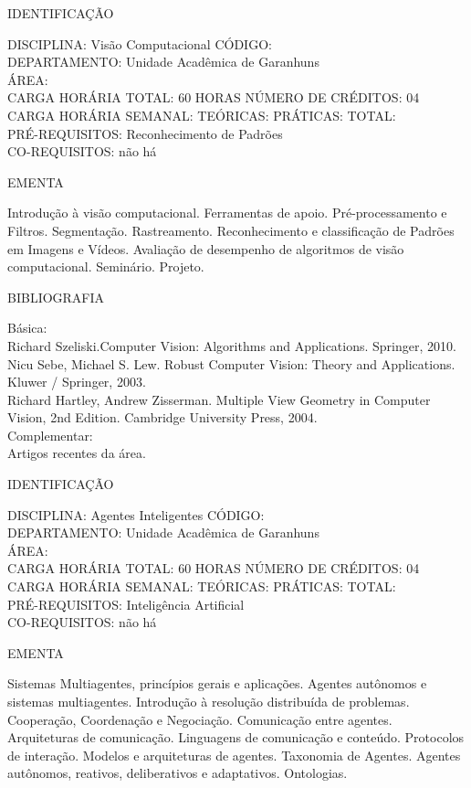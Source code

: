 \documentclass[
	12pt,				%
	openright,			%
  oneside,     %
	a4paper,			%
	english,			%
	french,				%
	spanish,			%
	brazil				%
	]{abntex2}
\begin{document}
\begin{apendicesenv}
\newpage IDENTIFICAÇÃO

DISCIPLINA: Visão Computacional CÓDIGO:\\ 
DEPARTAMENTO: Unidade Acadêmica de Garanhuns\\
ÁREA: \\
CARGA HORÁRIA TOTAL: 60 HORAS NÚMERO DE CRÉDITOS: 04\\
CARGA HORÁRIA SEMANAL: TEÓRICAS: PRÁTICAS: TOTAL: \\
PRÉ-REQUISITOS: Reconhecimento de Padrões\\
CO-REQUISITOS: não há

EMENTA 

Introdução à visão computacional. Ferramentas de apoio.
Pré-processamento e Filtros. Segmentação. Rastreamento. Reconhecimento
e classificação de Padrões em Imagens e Vídeos. Avaliação de desempenho
de algoritmos de visão computacional. Seminário. Projeto.

BIBLIOGRAFIA 

Básica:\\
Richard Szeliski.Computer Vision: Algorithms and Applications. Springer,
2010.\\
Nicu Sebe, Michael S. Lew. Robust Computer Vision: Theory and
Applications. Kluwer / Springer, 2003.\\
Richard Hartley, Andrew Zisserman. Multiple View Geometry in Computer
Vision, 2nd Edition. Cambridge University Press, 2004.\\
Complementar:\\
Artigos recentes da área.

\newpage IDENTIFICAÇÃO

DISCIPLINA: Agentes Inteligentes CÓDIGO:\\ 
DEPARTAMENTO: Unidade Acadêmica de Garanhuns\\
ÁREA: \\
CARGA HORÁRIA TOTAL: 60 HORAS NÚMERO DE CRÉDITOS: 04\\
CARGA HORÁRIA SEMANAL: TEÓRICAS: PRÁTICAS: TOTAL: \\
PRÉ-REQUISITOS: Inteligência Artificial\\
CO-REQUISITOS: não há

EMENTA 

Sistemas Multiagentes, princípios gerais e aplicações. Agentes autônomos
e sistemas multiagentes. Introdução à resolução distribuída de
problemas. Cooperação, Coordenação e Negociação. Comunicação entre
agentes. Arquiteturas de comunicação. Linguagens de comunicação e
conteúdo. Protocolos de interação. Modelos e arquiteturas de agentes.
Taxonomia de Agentes. Agentes autônomos, reativos, deliberativos e
adaptativos. Ontologias.


\end{apendicesenv}
\end{document}
